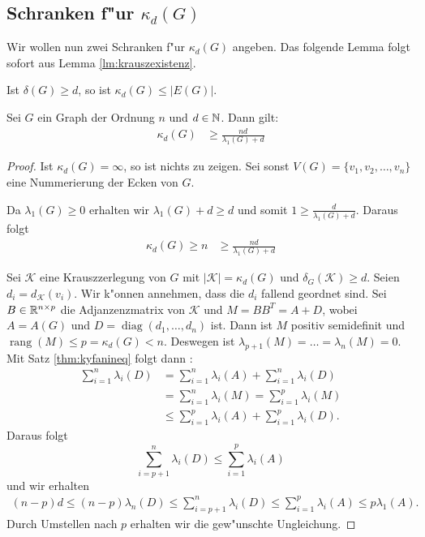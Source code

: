 \subsection{Schranken f"ur $\kappa_d(G)$}

Wir wollen nun zwei Schranken f"ur $\kappa_{d}(G)$ angeben. Das folgende Lemma folgt sofort aus Lemma \ref{lm:krauszexistenz}. 
\begin{lemma}
  Ist $\delta(G) \geq d$, so ist $\kappa_{d}(G) \leq |E(G)|$. 
\end{lemma}

\begin{theorem}
  Sei $G$ ein Graph der Ordnung $n$ und $d\in {\mathbb{N}}$. Dann gilt:
  \begin{align*}
    \kappa_{d}(G) &\geq \frac{nd}{\lambda_{1}(G) +d} 
  \end{align*}
  \label{thm:kappaineq1}
\end{theorem}

\begin{proof}
  Ist $\kappa_{d}(G) = \infty$, so ist nichts zu zeigen. Sei sonst $V(G) = \{v_1,v_2,\dots, v_n\}$ eine Nummerierung der Ecken von $G$.  

   Da $\lambda_{1}(G) \geq 0$ erhalten wir $\lambda_{1}(G) + d \geq d$ und somit $1\geq \frac{d}{\lambda_{1}(G) +d}$. Daraus folgt 
  \begin{align*}
    \kappa_{d}(G) \geq n &\geq \frac{nd}{\lambda_{1}(G)+d}
  \end{align*}

  Sei $\mathcal{K}$ eine Krauszzerlegung von $G$ mit $|\mathcal{K}| = \kappa_{d}(G)$ und $\delta_{G}(\mathcal{K}) \geq d$. Seien $d_{i} = d_{\mathcal{K}}(v_i)$. Wir k"onnen annehmen, dass die $d_{i}$ fallend geordnet sind. Sei $B\in {\mathbb{R}}^{n\times p}$ die Adjanzenzmatrix von $\mathcal{K}$ und $M = BB^{T} = A+D$, wobei $A= A(G)$ und $D = \operatorname{diag}(d_{1},\dots,d_n)$ ist.
  Dann ist $M$ positiv semidefinit und $\operatorname{rang} (M) \leq p = \kappa_{d}(G) < n $. Deswegen ist $\lambda_{p+1}(M) = \dots =\lambda_{n}(M) = 0$. 
  Mit Satz \ref{thm:kyfanineq} folgt dann : 
  \begin{align*}
    \sum\limits_{i=1}^{n} \lambda_{i}(D) &=\sum\limits_{i=1}^{n} \lambda_{i}(A) +\sum\limits_{i=1}^{n}  \lambda_{i}(D) \\
    &=\sum\limits_{i=1}^{n} \lambda_{i}(M) =\sum\limits_{i=1}^{p} \lambda_{i}(M) \\
    &\leq \sum\limits_{i=1}^{p} \lambda_{i}(A) +\sum\limits_{i=1}^{p} \lambda_{i}(D).
  \end{align*}
  Daraus folgt 
  $$\sum\limits_{i=p+1}^{n} \lambda_{i}(D) \leq\sum\limits_{i=1}^{p} \lambda_{i}(A)$$ und wir erhalten
  \begin{align*}
    (n-p) d \leq (n-p) \lambda_n(D) \leq \sum\limits_{i=p+1}^{n} \lambda_{i}(D) \leq\sum\limits_{i=1}^{p} \lambda_{i}(A) \leq p\lambda_{1}(A).
  \end{align*}
  Durch Umstellen nach $p$ erhalten wir die gew"unschte Ungleichung.
\end{proof}

